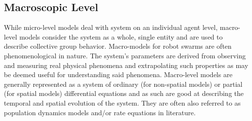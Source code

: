 \documentclass[Main.tex]{subfiles}
\begin{document}
\subsection{Macroscopic Level}
While micro-level models deal with system on an individual agent level, macro-level models consider the system as a whole, single entity and are used to describe collective group behavior. Macro-models for robot swarms are often phenomenological in nature. The system's parameters are derived from observing and measuring real physical phenomena and extrapolating such properties as may be deemed useful for understanding said phenomena. Macro-level models are generally represented as a system of ordinary (for non-spatial models) or partial (for spatial models) differential equations and as such are good at describing the temporal and spatial evolution of the system. They are often also referred to as population dynamics models and/or rate equations in literature.
\end{document}
